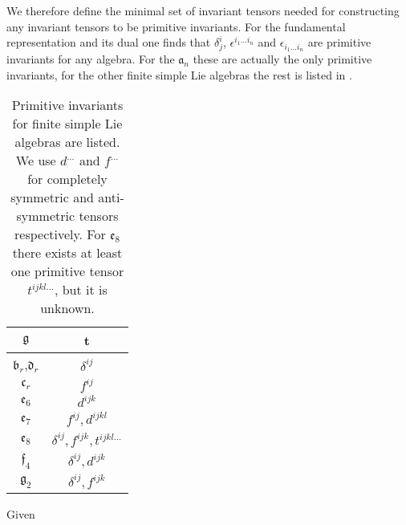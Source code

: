 \documentclass[11pt]{report}
\begin{document}
We therefore define the minimal set of invariant tensors needed for constructing any invariant tensors to be primitive invariants. For the fundamental representation and its dual one finds that $\delta^i_j$, $\epsilon^{i_1\ldots i_n}$ and $\epsilon_{i_1\ldots i_n}$ are primitive invariants for any algebra. For the $\mathfrak{a}_n$ these are actually the only primitive invariants, for the other finite simple Lie algebras the rest is listed in .
\begin{table}\centering
    \caption{Primitive invariants for finite simple Lie algebras are listed. We use $d^{\ldots}$ and $f^{\ldots}$ for completely symmetric and anti-symmetric tensors respectively. For $\mathfrak{e}_8$ there exists at least one primitive tensor $t^{ijkl\ldots}$, but it is unknown.}
    \label{tab:PrimInvariant}
    \begin{tabular}{|c|c|}\hline
        $\mathfrak{g}$ & t\\\hline
        $\mathfrak{b}_r$,$\mathfrak{d}_r$ & $\delta^{ij}$\\\hline
        $\mathfrak{c}_r$ & $f^{ij}$\\\hline
        $\mathfrak{e}_6$ & $d^{ijk}$\\\hline
        $\mathfrak{e}_7$ & $f^{ij},d^{ijkl}$\\\hline
        $\mathfrak{e}_8$ & $\delta^{ij},f^{ijk},t^{ijkl\ldots}$\\\hline
        $\mathfrak{f}_4$ & $\delta^{ij},d^{ijk}$\\\hline
        $\mathfrak{g}_2$ & $\delta^{ij},f^{ijk}$\\\hline
    \end{tabular}
\end{table}

Given 

\end{document}
